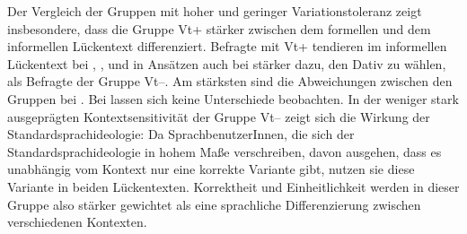 Der Vergleich der Gruppen mit hoher und geringer Variationstoleranz zeigt insbesondere, dass die Gruppe Vt+ stärker zwischen dem formellen und dem informellen Lückentext differenziert. 
Befragte mit Vt+ tendieren im informellen Lückentext bei \wegen, \waehrend, \dank{} und in Ansätzen auch bei  stärker dazu, den Dativ zu wählen, als Befragte der Gruppe Vt--. 
Am stärksten sind die Abweichungen zwischen den Gruppen bei \wegen. 
Bei \gegenueber{} lassen sich keine Unterschiede beobachten. 
In der weniger stark ausgeprägten Kontextsensitivität der Gruppe Vt-- zeigt sich die Wirkung der Standardsprachideologie: 
Da SprachbenutzerInnen, die sich der Standardsprachideologie in hohem Maße verschreiben, davon ausgehen, dass es unabhängig vom Kontext nur eine korrekte Variante gibt, nutzen sie diese Variante in beiden Lückentexten. 
Korrektheit und Einheitlichkeit werden in dieser Gruppe also stärker gewichtet als eine sprachliche Differenzierung zwischen verschiedenen Kontexten.  
